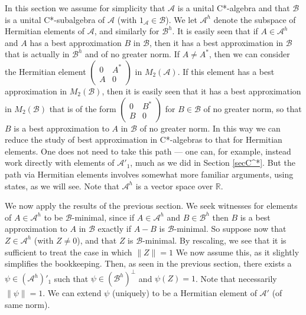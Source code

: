 \documentclass[12pt]{amsart}
\newcommand{\<}{\langle}
\renewcommand{\>}{\rangle}
\newcommand{\cA}{{\mathcal A}}
\newcommand{\cB}{{\mathcal B}}
\newcommand{\cAo}{{\mathcal A}'_1}
\newcommand{\cAH}{{\mathcal A}^h}
\newcommand{\cBH}{{\mathcal B}^h}
\newcommand{\cAD}{({\mathcal A^h})'_1}
\newcommand{\bR}{{\mathbb R}}
\theoremstyle{definition}   %
\begin{document}
In this section we assume for simplicity that $\cA$ is a unital 
C*-algebra and that
$\cB$ is a unital C*-subalgebra of $\cA$ (with $1_\cA \in \cB$).
We let $\cAH$ denote the subspace of Hermitian elements of $\cA$,
and similarly for $\cBH$. It is easily seen that if $A \in \cAH$ and $A$
has a best approximation $B$ in $\cB$, then it has a best approximation
in $\cB$ that is actually in $\cBH$ and of no greater norm.
If $A \neq A^*$, then we can consider the Hermitian element
$
\begin{pmatrix}  0 & A^*  \\
                          A & 0      \end{pmatrix} 
$
in $M_2(\cA)$. If this element has a best approximation in $M_2(\cB)$,
then it is easily seen that it has a best approximation in $M_2(\cB)$
that is of the form 
$
\begin{pmatrix}  0 & B^*  \\
                          B & 0      \end{pmatrix} 
$
for $B \in \cB$ of no greater norm, so that $B$ is a best approximation
to $A$ in $\cB$ of no greater norm. In this way we can reduce the study
of best approximation in C*-algebras to that for Hermitian elements.
One does not need to take this path  ---  one can, for example, instead
work directly with elements of $\cAo$, much as we did
in Section \ref{secC^*}. But the path via Hermitian
elements involves somewhat more familiar arguments, using states, as 
we will see. Note that $\cAH$ is a vector space over $\bR$. 

We now
apply the results of the previous section. We seek witnesses for
elements of $A \in \cAH$ to be $\cB$-minimal, since if $A \in \cAH$
and $B \in \cBH$ then $B$ is a best approximation to $A$ in $\cB$
exactly if $A-B$ is $\cB$-minimal. So suppose now that $Z \in \cAH$
(with $Z \neq 0$), and that $Z$ is $\cB$-minimal. 
By rescaling, we see that it is
sufficient to treat the case in which $\|Z\| = 1$ We now assume this,
as it slightly simplifies the bookkeeping. Then, as seen in the previous
section, there exists a $\psi \in \cAD$ such that $\psi \in (\cBH)^\perp$
and $\psi(Z) = 1$. Note that necessarily $\|\psi\| = 1$. We can 
extend $\psi$ (uniquely) to be
a Hermitian element of $\cA'$ (of same norm). 
\end{document}

